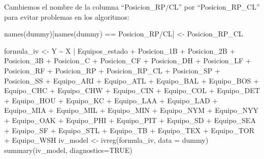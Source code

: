 \documentclass[
]{article}
\newenvironment{Shaded}{\begin{snugshade}}{\end{snugshade}}
\newcommand{\AttributeTok}[1]{\textcolor[rgb]{0.77,0.63,0.00}{#1}}
\newcommand{\ConstantTok}[1]{\textcolor[rgb]{0.00,0.00,0.00}{#1}}
\newcommand{\FunctionTok}[1]{\textcolor[rgb]{0.00,0.00,0.00}{#1}}
\newcommand{\NormalTok}[1]{#1}
\newcommand{\OtherTok}[1]{\textcolor[rgb]{0.56,0.35,0.01}{#1}}
\newcommand{\SpecialCharTok}[1]{\textcolor[rgb]{0.00,0.00,0.00}{#1}}
\newcommand{\StringTok}[1]{\textcolor[rgb]{0.31,0.60,0.02}{#1}}
\begin{document}
Cambiemos el nombre de la columna ``Posicion\_RP/CL'' por
``Posicion\_RP\_CL'' para evitar problemas en los algoritmos:

\begin{Shaded}
\begin{Highlighting}[]
\FunctionTok{names}\NormalTok{(dummy)[}\FunctionTok{names}\NormalTok{(dummy) }\SpecialCharTok{==} \StringTok{\textquotesingle{}Posicion\_RP/CL\textquotesingle{}}\NormalTok{] }\OtherTok{\textless{}{-}} \StringTok{\textquotesingle{}Posicion\_RP\_CL\textquotesingle{}}
\end{Highlighting}
\end{Shaded}

\begin{Shaded}
\begin{Highlighting}[]
\NormalTok{formula\_iv }\OtherTok{\textless{}{-}}\NormalTok{ Y }\SpecialCharTok{\textasciitilde{}}\NormalTok{ X }\SpecialCharTok{|}\NormalTok{ Equipos\_estado }\SpecialCharTok{+}\NormalTok{ Posicion\_1B }\SpecialCharTok{+}\NormalTok{ Posicion\_2B }\SpecialCharTok{+}\NormalTok{ Posicion\_3B }\SpecialCharTok{+}\NormalTok{ Posicion\_C }\SpecialCharTok{+}\NormalTok{ Posicion\_CF }\SpecialCharTok{+}\NormalTok{ Posicion\_DH }\SpecialCharTok{+}\NormalTok{ Posicion\_LF }\SpecialCharTok{+}\NormalTok{ Posicion\_RF }\SpecialCharTok{+}\NormalTok{ Posicion\_RP }\SpecialCharTok{+}\NormalTok{ Posicion\_RP\_CL }\SpecialCharTok{+}\NormalTok{  Posicion\_SP }\SpecialCharTok{+}\NormalTok{ Posicion\_SS }\SpecialCharTok{+}\NormalTok{ Equipo\_ARI }\SpecialCharTok{+}\NormalTok{ Equipo\_ATL }\SpecialCharTok{+}\NormalTok{ Equipo\_BAL }\SpecialCharTok{+}\NormalTok{ Equipo\_BOS }\SpecialCharTok{+}\NormalTok{ Equipo\_CHC }\SpecialCharTok{+}\NormalTok{ Equipo\_CHW }\SpecialCharTok{+}\NormalTok{ Equipo\_CIN }\SpecialCharTok{+}\NormalTok{  Equipo\_COL }\SpecialCharTok{+}\NormalTok{ Equipo\_DET }\SpecialCharTok{+}\NormalTok{ Equipo\_HOU }\SpecialCharTok{+}\NormalTok{  Equipo\_KC  }\SpecialCharTok{+}\NormalTok{  Equipo\_LAA }\SpecialCharTok{+}\NormalTok{  Equipo\_LAD }\SpecialCharTok{+}\NormalTok{  Equipo\_MIA }\SpecialCharTok{+}\NormalTok{ Equipo\_MIL }\SpecialCharTok{+}\NormalTok{ Equipo\_MIN }\SpecialCharTok{+}\NormalTok{  Equipo\_NYM }\SpecialCharTok{+}\NormalTok{  Equipo\_NYY }\SpecialCharTok{+}\NormalTok{   Equipo\_OAK }\SpecialCharTok{+}\NormalTok{ Equipo\_PHI }\SpecialCharTok{+}\NormalTok{ Equipo\_PIT }\SpecialCharTok{+}\NormalTok{   Equipo\_SD  }\SpecialCharTok{+}\NormalTok{  Equipo\_SEA }\SpecialCharTok{+}\NormalTok{  Equipo\_SF  }\SpecialCharTok{+}\NormalTok{  Equipo\_STL }\SpecialCharTok{+}\NormalTok{ Equipo\_TB  }\SpecialCharTok{+}\NormalTok{  Equipo\_TEX }\SpecialCharTok{+}\NormalTok{ Equipo\_TOR }\SpecialCharTok{+}\NormalTok{ Equipo\_WSH }
\NormalTok{iv\_model }\OtherTok{\textless{}{-}} \FunctionTok{ivreg}\NormalTok{(formula\_iv, }\AttributeTok{data =}\NormalTok{ dummy)}
\FunctionTok{summary}\NormalTok{(iv\_model, }\AttributeTok{diagnostics=}\ConstantTok{TRUE}\NormalTok{)}
\end{Highlighting}
\end{Shaded}
\end{document}
